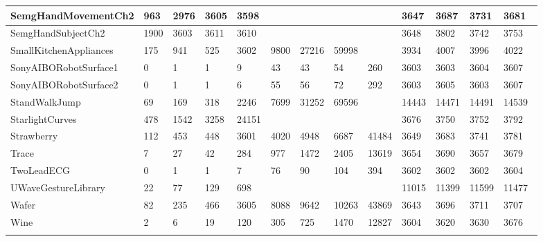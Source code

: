 \begin{landscape}
\begin{longtable}{|l|llll|llll|llll|}
      SemgHandMovementCh2 & 963 & 2976 & 3605 & 3598 &  &  &  &  & 3647 & 3687 & 3731 & 3681 \\ \hline
      SemgHandSubjectCh2 & 1900 & 3603 & 3611 & 3610 &  &  &  &  & 3648 & 3802 & 3742 & 3753 \\ \hline
      SmallKitchenAppliances & 175 & 941 & 525 & 3602 & 9800 & 27216 & 59998 &  & 3934 & 4007 & 3996 & 4022 \\ \hline
      SonyAIBORobotSurface1 & 0 & 1 & 1 & 9 & 43 & 43 & 54 & 260 & 3603 & 3603 & 3604 & 3607 \\ \hline
      SonyAIBORobotSurface2 & 0 & 1 & 1 & 6 & 55 & 56 & 72 & 292 & 3603 & 3605 & 3603 & 3607 \\ \hline
      StandWalkJump & 69 & 169 & 318 & 2246 & 7699 & 31252 & 69596 &  & 14443 & 14471 & 14491 & 14539 \\ \hline
      StarlightCurves & 478 & 1542 & 3258 & 24151 &  &  &  &  & 3676 & 3750 & 3752 & 3792 \\ \hline
      Strawberry & 112 & 453 & 448 & 3601 & 4020 & 4948 & 6687 & 41484 & 3649 & 3683 & 3741 & 3781 \\ \hline
      Trace & 7 & 27 & 42 & 284 & 977 & 1472 & 2405 & 13619 & 3654 & 3690 & 3657 & 3679 \\ \hline
      TwoLeadECG & 0 & 1 & 1 & 7 & 76 & 90 & 104 & 394 & 3602 & 3602 & 3602 & 3604 \\ \hline
      UWaveGestureLibrary & 22 & 77 & 129 & 698 &  &  &  &  & 11015 & 11399 & 11599 & 11477 \\ \hline
      Wafer & 82 & 235 & 466 & 3605 & 8088 & 9642 & 10263 & 43869 & 3643 & 3696 & 3711 & 3707 \\ \hline
      Wine & 2 & 6 & 19 & 120 & 305 & 725 & 1470 & 12827 & 3604 & 3620 & 3630 & 3676 \\ \hline
    \label{tab:longduration}
    \end{longtable}
\end{landscape}

